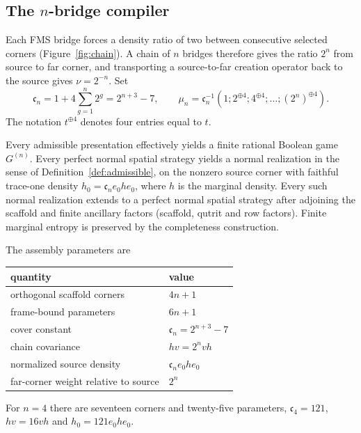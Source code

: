 \subsection{The \texorpdfstring{$n$}{n}-bridge compiler}\label{sec:fourbridge}
Each FMS bridge forces a density ratio of two between consecutive selected corners (Figure~\ref{fig:chain}). A chain of $n$ bridges therefore gives the ratio $2^n$ from source to far corner, and transporting a source-to-far creation operator back to the source gives $\nu=2^{-n}$. Set
\begin{equation}\label{eq:weights}
 \mathfrak c_n=1+4\sum_{g=1}^n2^g=2^{n+3}-7,\qquad
 \mu_n=\mathfrak c_n^{-1}(1;2^{\oplus4};4^{\oplus4};\ldots;(2^n)^{\oplus4}).
\end{equation}
The notation $t^{\oplus4}$ denotes four entries equal to $t$.

\begin{lemma}\label{lem:four}
Every admissible presentation effectively yields a finite rational Boolean game $G^{(n)}$. Every perfect normal spatial strategy yields a normal realization in the sense of Definition~\ref{def:admissible}, on the nonzero source corner with faithful trace-one density $h_0=\mathfrak c_ne_0he_0$, where $h$ is the marginal density. Every such normal realization extends to a perfect normal spatial strategy after adjoining the scaffold and finite ancillary factors (scaffold, qutrit and row factors). Finite marginal entropy is preserved by the completeness construction.\end{lemma}
The assembly parameters are
\begin{center}
\begin{tabular}{@{}ll@{}}\toprule
quantity&value\\\midrule
orthogonal scaffold corners&$4n+1$\\
frame-bound parameters&$6n+1$\\
cover constant&$\mathfrak c_n=2^{n+3}-7$\\
chain covariance&$hv=2^n vh$\\
normalized source density&$\mathfrak c_n e_0he_0$\\
far-corner weight relative to source&$2^n$\\\bottomrule
\end{tabular}
\end{center}
For $n=4$ there are seventeen corners and twenty-five parameters, $\mathfrak c_4=121$, $hv=16vh$ and $h_0=121e_0he_0$.

